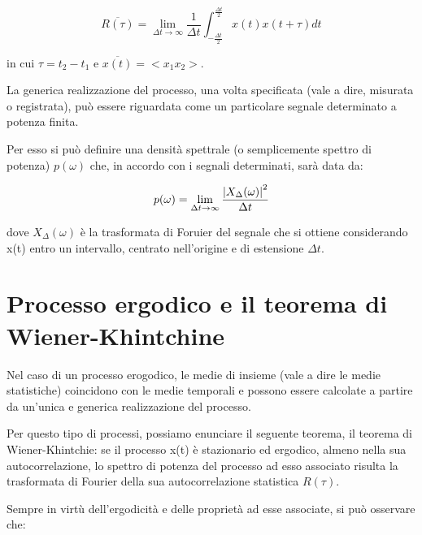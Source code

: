 {
    \Large 
    \begin{equation}
        \overline{R (\tau)} 
        = 
        \lim_{\Delta t \to \infty}
        \frac{1}{\Delta t}
        \int_{-\frac{\Delta t}{2}}^{\frac{\Delta t}{2}} 
        x(t) 
        x(t + \tau)
        dt  
    \end{equation}
}

in cui $\tau = t_2 - t_1$ e $\overline{x(t)} = <x_1 x_2> $.  \newline 


La generica realizzazione del processo, una volta specificata (vale a dire, misurata o registrata), 
può essere riguardata come un particolare segnale determinato a potenza finita. \newline 

Per esso si può definire una densità spettrale (o semplicemente spettro di potenza) $p(\omega)$ che, 
in accordo con i segnali determinati, sarà data da: 

{
    \Large 
    \begin{equation}
        p(\omega) = \lim_{\Delta t \to \infty} \frac{\abs{X_\Delta (\omega)}^{2}}{\Delta t}
    \end{equation}
}


dove $X_\Delta (\omega)$ è la trasformata di Foruier del segnale che si ottiene considerando x(t) entro un intervallo, 
centrato nell'origine e di estensione $\Delta t$. \newline 

\newpage 

\section{Processo ergodico e il teorema di Wiener-Khintchine}

Nel caso di un processo erogodico, le medie di insieme (vale a dire le medie statistiche) coincidono con le medie temporali e possono essere 
calcolate a partire da un'unica e generica realizzazione del processo. \newline 

Per questo tipo di processi, possiamo enunciare il seguente teorema, il teorema di Wiener-Khintchie: 
se il processo x(t) è stazionario ed ergodico, almeno nella sua autocorrelazione, lo spettro di potenza del processo ad esso associato risulta 
la trasformata di Fourier della sua autocorrelazione statistica $R(\tau)$. \newline 


Sempre in virtù dell'ergodicità e delle proprietà ad esse associate, si può osservare che:

